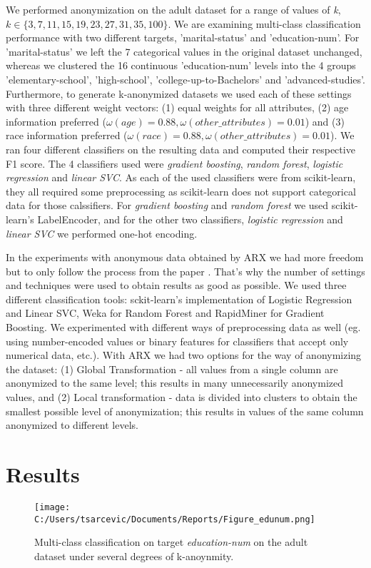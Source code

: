 \documentclass{article}
\begin{document}
We performed anonymization on the adult dataset for a range of values of \textit{k}, ${k \in \{3, 7, 11, 15, 19, 23, 27, 31, 35, 100\}}$. We are examining multi-class classification performance with two different targets, 'marital-status' and 'education-num'. For 'marital-status' we left the 7 categorical values in the original dataset unchanged, whereas we clustered the 16 continuous 'education-num' levels into the 4 groups 'elementary-school', 'high-school', 'college-up-to-Bachelors' and 'advanced-studies'. 
Furthermore, to generate k-anonymized datasets we used each of these settings with three different weight vectors: (1) equal weights for all attributes, (2) age information preferred (${\omega(age)=0.88, \omega(other\_attributes)=0.01}$) and (3) race information preferred (${\omega(race)=0.88, \omega(other\_attributes)=0.01}$).
We ran four different classifiers on the resulting data and computed their respective F1 score. The 4 classifiers used were \textit{gradient boosting}, \textit{random forest}, \textit{logistic regression} and \textit{linear SVC}. As each of the used classifiers were from scikit-learn, they all required some preprocessing as scikit-learn does not support categorical data for those calssifiers. For \textit{gradient boosting} and \textit{random forest} we used scikit-learn's LabelEncoder, and for the other two classifiers,  \textit{logistic regression} and \textit{linear SVC} we performed one-hot encoding.

In the experiments with anonymous data obtained by ARX we had more freedom but to only follow the process from the paper \cite{malle2017not}. That's why the number of settings and techniques were used to obtain results as good as possible. We used three different classification tools: sckit-learn's implementation of Logistic Regression and Linear SVC, Weka for Random Forest and RapidMiner for Gradient Boosting. We experimented with different ways of preprocessing data as well (eg. using number-encoded values or binary features for classifiers that accept only numerical data, etc.). With ARX we had two options for the way of anonymizing the dataset: (1) Global Transformation - all values from a single column are anonymized to the same level; this results in many unnecessarily anonymized values, and (2) Local transformation - data is divided into clusters to obtain the smallest possible level of anonymization; this results in values of the same column anonymized to different levels. 


\section{Results}
\begin{figure}
	\texttt{[image: C:/Users/tsarcevic/Documents/Reports/Figure\_edunum.png]}
	\caption{Multi-class classification on target \textit{education-num} on the adult dataset under several degrees of k-anoynmity.}
 	\label{fig:edunum}
\end{figure}
\end{document}
